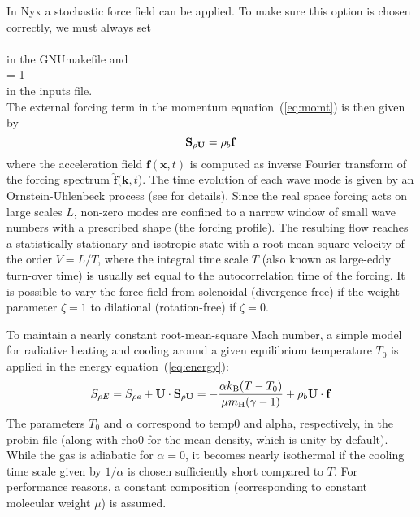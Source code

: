In Nyx a stochastic force field can be applied. To make sure this option is chosen correctly, we must always set \\

 \\

\noindent in the GNUmakefile and \\

 = 1  \\

\noindent in the inputs file.  \\

The external forcing term in the momentum equation~(\ref{eq:momt}) is then given by
\begin{equation}
  {\bf S}_{\rho {\bf U}} = \rho_b {\bf f}
\end{equation}
where the acceleration field $\mathbf{f}(\mathbf{x},t)$ is computed as inverse Fourier transform of the forcing spectrum $\widehat{\mathbf{f}}(\mathbf{k},t$). The time evolution of each wave mode is given by an Ornstein-Uhlenbeck process (see \cite{SchmHille06,Schmidt14} for details). Since the real space forcing acts on large scales $L$, non-zero modes are confined to a narrow window of small wave numbers with a prescribed shape (the forcing profile). The resulting flow reaches a statistically stationary and isotropic state with a root-mean-square velocity of the order $V=L/T$, where the integral time scale $T$ (also known as large-eddy turn-over time) is usually set equal to the autocorrelation time of the forcing. It is possible to vary the force field from solenoidal (divergence-free) if the weight parameter $\zeta=1$ to dilational (rotation-free) if $\zeta=0$. 

To maintain a nearly constant root-mean-square Mach number, a simple model for radiative heating and cooling around a given equilibrium temperature $T_0$ is applied in the energy equation~(\ref{eq:energy}):
\begin{equation}
  S_{\rho E} = S_{\rho e} + {\bf U} \cdot {\bf S}_{\rho {\bf U}} = -\frac{\alpha k_{\rm B}(T-T_0)}{\mu m_{\rm H}(\gamma-1)} + \rho_b{\bf U}\cdot{\bf f}
\end{equation}
The parameters $T_0$ and $\alpha$ correspond to temp0 and alpha, respectively, in the probin file (along with rho0 for the mean density, which is unity by default). While the gas is adiabatic for $\alpha=0$, it becomes
nearly isothermal if the cooling time scale given by $1/\alpha$ is chosen sufficiently short compared to $T$. For performance reasons, a constant composition (corresponding to constant molecular weight $\mu$) is assumed.


